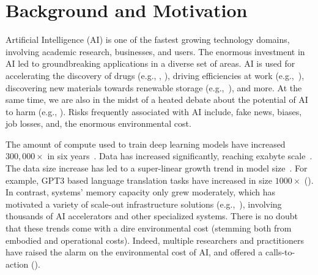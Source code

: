 \section{Background and Motivation}
{
    \label{background}

    Artificial Intelligence (AI) is one of the fastest growing technology domains, involving academic research, businesses, and users. The enormous investment in AI led to groundbreaking applications in a diverse set of areas. AI is used for accelerating the discovery of drugs (e.g., \cite{Stark2022}, \cite{Ross2022}), driving efficiencies at work (e.g.,~\cite{Puri2021}), discovering new materials towards renewable storage (e.g.,~\cite{Zitnick2020}), and more. At the same time, we are also in the midst of a heated debate about the potential of AI to harm (e.g., \cite{AIdanger}). Risks frequently associated with AI include, fake news, biases, job losses, and, the enormous environmental cost.

    The amount of compute used to train deep learning models have increased $300,\!000 \times$ in six years~\cite{Schwartz2019}. Data has increased significantly, reaching exabyte scale~\cite{Wu2022}. The data size increase has led to a super-linear growth trend in model size~\cite{Wu2022}. For example, GPT3 based language translation tasks have increased in size $1000 \times$ (\cite{Brown2020}). In contrast, systems' memory capacity only grew moderately, which has motivated a variety of scale-out infrastructure solutions (e.g.,~\cite{Patterson2021,Wu2022}), involving thousands of AI accelerators and other specialized systems. There is no doubt that these trends come with a dire environmental cost (stemming both from embodied and operational costs). Indeed, multiple researchers and practitioners have raised the alarm on the environmental cost of AI, and offered a calls-to-action (\cite{Strubell2019,Lacoste2019,Henderson2020,Schwartz2019}).

}
